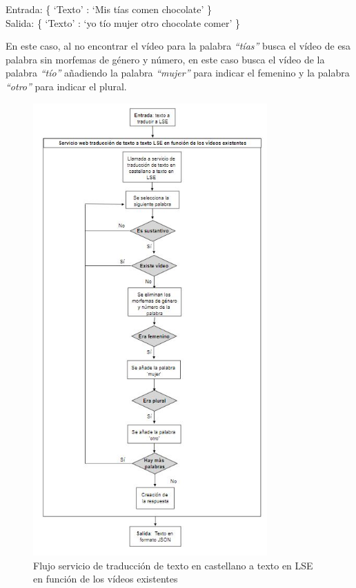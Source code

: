 \begin{center}
	Entrada: \{ `Texto' : `Mis tías comen chocolate' \} \\
	Salida: \{ `Texto' : `yo tío mujer otro chocolate comer' \}
\end{center}

En este caso, al no encontrar el vídeo para la palabra \textit{``tías''} busca el vídeo de esa palabra sin morfemas de género y número, en este caso busca el vídeo de la palabra \textit{``tío''} añadiendo la palabra  \textit{``mujer''} para indicar el femenino y la palabra  \textit{``otro''} para indicar el plural.


\begin{figure}[]
	\centering
	\includegraphics[width=0.8\textwidth]{Imagenes/Fuentes/Text2LSE/FlujoTextoVideoTexto.jpg}
	\caption{ Flujo servicio de traducción de texto en castellano a texto en LSE en función de los vídeos existentes }
	\label {fig: imgFlujoTextoVideoTextoText2LSE}
\end{figure}

